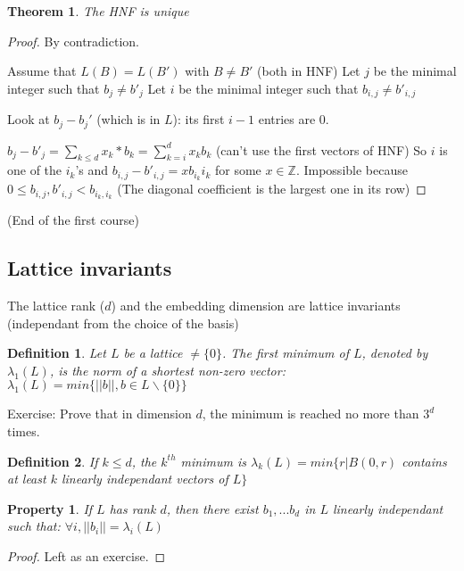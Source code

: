 \documentclass[a4paper,10pt]{article}
\newtheorem{definition}{Definition}
\newtheorem{theorem}{Theorem}
\newtheorem{proposition}{Property}
\begin{document}
\begin{theorem}
The HNF is unique
\end{theorem}
\begin{proof}
By contradiction.

Assume that $L(B)=L(B')$ with $B \neq B'$ (both in HNF)
Let $j$ be the minimal integer such that $b_j \neq b'_j$
Let $i$ be the minimal integer such that $b_{i,j} \neq b'_{i,j}$

Look at $b_j-b_j'$ (which is in $L$): its first $i-1$ entries are $0$. 

$b_j-b'_j = \sum_{k \leq d} x_k*b_k = \sum_{k=i}^d x_k b_k$ (can't use the first vectors of HNF)
So $i$ is one of the $i_k$'s and $b_{i,j}-b'_{i,j}=x b_{i_k} i_k$ for some $x \in \mathbb{Z}$.
Impossible because $0 \leq b_{i,j}, b'_{i,j} < b_{i_k,i_k}$ (The diagonal coefficient is the largest one in its row)
\end{proof}

(End of the first course)

\subsection{Lattice invariants}

The lattice rank ($d$) and the embedding dimension are lattice invariants (independant from the choice of the basis)

\begin{definition}
Let $L$ be a lattice $\neq \{ 0 \}$. The first minimum of $L$, denoted by $\lambda_1 (L)$, is the norm of a shortest non-zero vector: $\lambda_1(L)=min\{||b||, b \in L \backslash \{ 0 \}\}$
\end{definition}

Exercise: Prove that in dimension $d$, the minimum is reached no more than $3^d$ times.

\begin{definition}
If $k \leq d$, the $k^{th}$ minimum is $\lambda_k(L)=min\{r | B(0,r)$ contains at least $k$ linearly independant vectors of $L \}$
\end{definition}

\begin{proposition}
If $L$ has rank $d$, then there exist $b_1,...b_d$ in $L$ linearly independant such that: $\forall i, ||b_i||=\lambda_i(L)$
\end{proposition}

\begin{proof}
Left as an exercise.
\end{proof}
\end{document}

